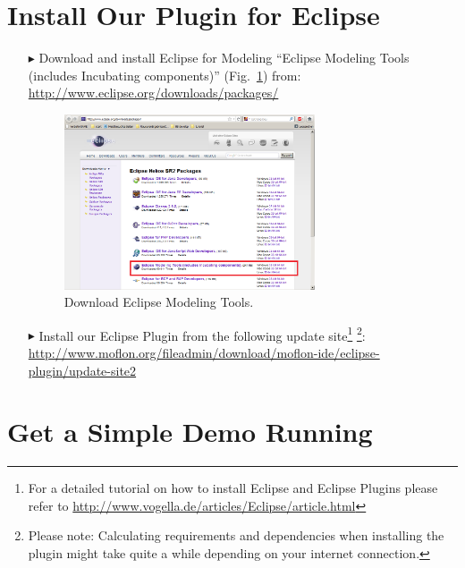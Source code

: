 \section{Install Our Plugin for Eclipse}
\begin{enumerate}
\item[$\blacktriangleright$] Download and install Eclipse for Modeling
``Eclipse Modeling Tools (includes Incubating components)''
(Fig.~\ref{fig_downloadModelingPackage}) from:\\  
\url{http://www.eclipse.org/downloads/packages/}
\begin{figure}[!h]
	\centering
  \includegraphics[width=0.7\textwidth]{pics/eclipse_modelingpackage.png}
	\caption{Download Eclipse Modeling Tools.}
	\label{fig_downloadModelingPackage}
\end{figure}
\vspace{-0.5cm}
\item[$\blacktriangleright$] Install our Eclipse Plugin from the following
update site\footnote{For a detailed tutorial on how to install Eclipse and
Eclipse Plugins please refer to
\url{http://www.vogella.de/articles/Eclipse/article.html}} 
\footnote{Please note: Calculating requirements and dependencies when installing
the plugin might take quite a while depending on your internet connection.}:
\url{http://www.moflon.org/fileadmin/download/moflon-ide/eclipse-plugin/update-site2}
\end{enumerate}

\section{Get a Simple Demo Running}

